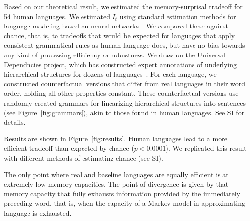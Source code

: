 \documentclass[12pt]{article}
\newcommand{\jd}[1]{\textcolor{Red}{[jd: #1]}}
\newcommand{\note}[1]{\textcolor{Red}{[note: #1]}}
\begin{document}
Based on our theoretical result, we estimated the memory-surprisal tradeoff for 54 human languages.
We estimated $I_t$ using standard estimation methods for language modeling based on neural networks~\cite{hochreiter-long-1997}.
We compared these against chance, that is, to tradeoffs that would be expected for languages that apply consistent grammatical rules as human language does, but have no bias towards any kind of processing efficiency or robustness.
We draw on the Universal Dependncies project, which has constructed expert annotations of underlying hierarchical structures for dozens of languages~\cite{nivre-universal-2017}.
For each language, we constructed counterfactual versions that differ from real languages in their word order, holding all other properties constant.
These counterfactual versions use randomly created grammars for linearizing hierarchical structures into sentences (see Figure~\ref{fig:grammars}), akin to those found in human languages.
See SI for details.


%


Results are shown in Figure~\ref{fig:results}.
Human languages lead to a more efficient tradeoff than expected by chance ($p < 0.0001$).
We replicated this result with different methods of estimating chance (see SI).


The only point where real and baseline languages are equally efficient is at extremely low memory capacities.
The point of divergence is given by that memory capacity that fully exhausts information provided by the immediately preceding word, that is, when the capacity of a Markov model in approximating language is exhausted.
\end{document}
